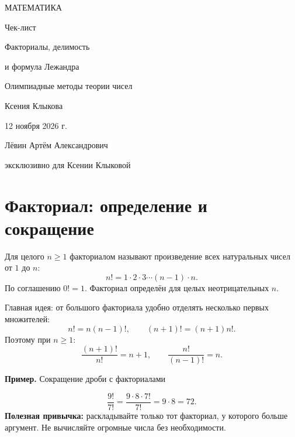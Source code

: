 \documentclass[a4paper,11pt]{article}
\newcommand{\key}[1]{\textcolor{deepaccent}{#1}}
\newcommand{\ex}[1]{\par\medskip\textcolor{deepaccent}{\textbf{Пример.} #1}\par\smallskip}
\begin{document}
\thispagestyle{empty}
\begin{center}
\vspace*{23mm}
{\Large\color{deepaccent} МАТЕМАТИКА\par}
\vspace{27mm}
{\huge Чек-лист\par}
\vspace{15mm}
{\LARGE\color{accent} Факториалы, делимость\par}
\vspace{2mm}
{\LARGE\color{accent} и формула Лежандра\par}
\vspace{20mm}
{\large Олимпиадные методы теории чисел\par}
\vfill
{\large Ксения Клыкова\par}
\vspace{12mm}
{\large 12 ноября 2026 г.\par}
\vspace{23mm}
{\small Лёвин Артём Александрович\par}
{\small эксклюзивно для Ксении Клыковой\par}
\vspace{19mm}
\end{center}
\clearpage

\section{Факториал: определение и сокращение}
Для целого $n\ge 1$ \key{факториалом} называют произведение всех натуральных чисел от $1$ до $n$:
\[
 n! = 1\cdot2\cdot3\cdots(n-1)\cdot n.
\]
По соглашению $0!=1$. Факториал определён для целых неотрицательных $n$.

\key{Главная идея:} от большого факториала удобно отделять несколько первых множителей:
\[
\boxed{n!=n(n-1)!},\qquad
\boxed{(n+1)!=(n+1)n!}.
\]
Поэтому при $n\ge1$:
\[
 \frac{(n+1)!}{n!}=n+1, \qquad
 \frac{n!}{(n-1)!}=n.
\]

\ex{Сокращение дроби с факториалами}
\[
\frac{9!}{7!}=\frac{9\cdot8\cdot7!}{7!}=9\cdot8=72.
\]
\textbf{Полезная привычка:} раскладывайте только тот факториал, у которого больше аргумент. Не вычисляйте огромные числа без необходимости.
\end{document}
